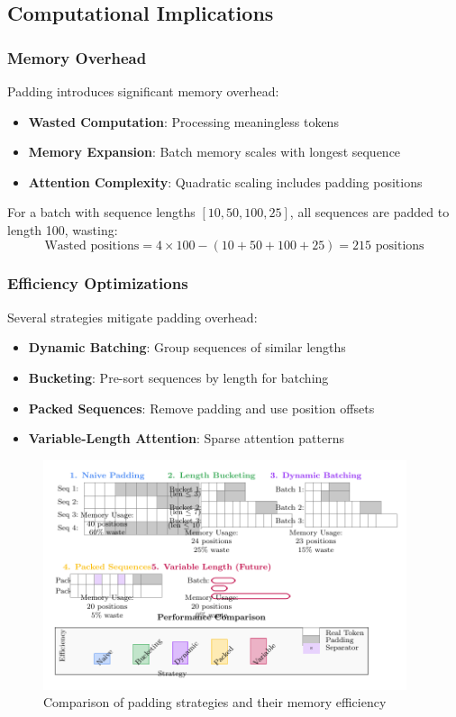 \subsection{Computational Implications}

\subsubsection{Memory Overhead}
Padding introduces significant memory overhead:
\begin{itemize}
\item \textbf{Wasted Computation}: Processing meaningless \pad{} tokens
\item \textbf{Memory Expansion}: Batch memory scales with longest sequence
\item \textbf{Attention Complexity}: Quadratic scaling includes padding positions
\end{itemize}

For a batch with sequence lengths $[10, 50, 100, 25]$, all sequences are padded to length 100, wasting:
$$\text{Wasted positions} = 4 \times 100 - (10 + 50 + 100 + 25) = 215 \text{ positions}$$

\subsubsection{Efficiency Optimizations}
Several strategies mitigate padding overhead:

\begin{itemize}
\item \textbf{Dynamic Batching}: Group sequences of similar lengths
\item \textbf{Bucketing}: Pre-sort sequences by length for batching
\item \textbf{Packed Sequences}: Remove padding and use position offsets
\item \textbf{Variable-Length Attention}: Sparse attention patterns
\end{itemize}

\begin{figure}[h]
\centering
\includegraphics[width=0.95\textwidth]{part1/chapter02/fig_padding_strategies.pdf}
\caption{Comparison of padding strategies and their memory efficiency}
\end{figure}

